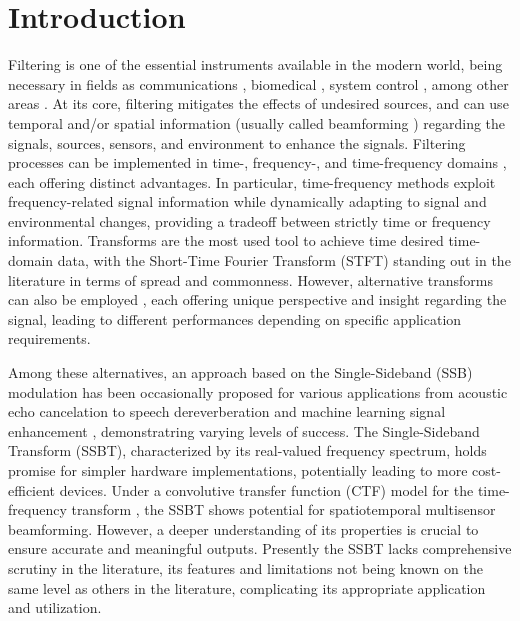 \section{Introduction}
\label{sec:introduction}


Filtering is one of the essential instruments available in the modern world, being necessary in fields as communications \cite{chen_source_2002}, biomedical \cite{lobato_worst-case-optimization_2020,lu_biomedical_1994,nguyen_minimum_2017}, system control \cite{han_comparative_2016, hagglund_signal_2012}, among other areas \cite{hathcock_noise_2016,lee_general_2002,shi_new_2004}. At its core, filtering mitigates the effects of undesired sources, and can use temporal and/or spatial information (usually called beamforming \cite{dougherty_functional_2014}) regarding the signals, sources, sensors, and environment to enhance the signals. Filtering processes can be implemented in time-, frequency-, and time-frequency domains \cite{benesty_fundamentals_2017}, each offering distinct advantages. In particular, time-frequency methods exploit frequency-related signal information while dynamically adapting to signal and environmental changes, providing a tradeoff between strictly time or frequency information. Transforms are the most used tool to achieve time desired time-domain data, with the Short-Time Fourier Transform (STFT) \cite{kiymik_comparison_2005,pan_microphone_2021} standing out in the literature in terms of spread and commonness. However, alternative transforms can also be employed \cite{chen_wavelet-based_2018,yang_general_2014,almeida_fractional_1994}, each offering unique perspective and insight regarding the signal, leading to different performances depending on specific application requirements.


Among these alternatives, an approach based on the Single-Sideband (SSB) modulation has been occasionally proposed  \cite{crochiere_multirate_1983} for various applications from acoustic echo cancelation \cite{chin_subband_2001} to speech dereverberation \cite{oyzerman_system_2012} and machine learning signal enhancement \cite{okamoto_subband_2017}, demonstratring varying levels of success. The Single-Sideband Transform (SSBT), characterized by its real-valued frequency spectrum, holds promise for simpler hardware implementations, potentially leading to more cost-efficient devices. Under a convolutive transfer function (CTF) model for the time-frequency transform \cite{talmon_relative_2009}, the SSBT shows potential for spatiotemporal multisensor beamforming. However, a deeper understanding of its properties is crucial to ensure accurate and meaningful outputs. Presently the SSBT lacks comprehensive scrutiny in the literature, its features and limitations not being known on the same level as others in the literature, complicating its appropriate application and utilization.

